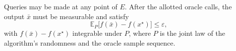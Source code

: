 \documentclass[10pt]{article}
\theoremstyle{definition}
\begin{document}
Queries may be made at any point of $E$. After the allotted oracle calls, the output $\bar{x}$ must be measurable and satisfy
\[
\mathbb{E}_{P}\bigl[f(\bar{x})-f(x^\star)\bigr]\leq\varepsilon,
\]
with $f(\bar{x})-f(x^\star)$ integrable under $P$, where $P$ is the joint law of the algorithm's randomness and the oracle sample sequence.
\end{document}
